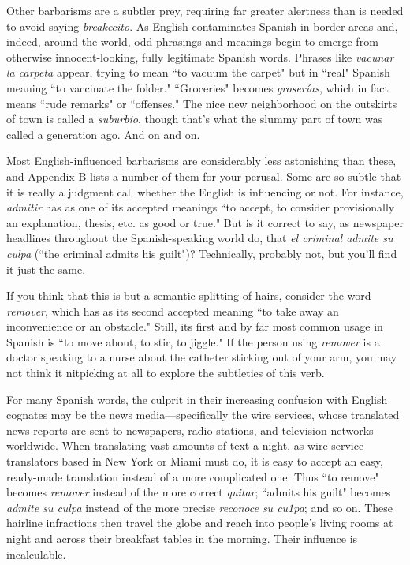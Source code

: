 Other barbarisms are a subtler prey, requiring far greater alertness than is needed to avoid saying \emph{breakecito}. As English contaminates Spanish in border areas and, indeed, around the world, odd phrasings and meanings begin to emerge from otherwise innocent-looking,
fully legitimate Spanish words. Phrases like \emph{vacunar la carpeta} appear,
trying to mean ``to vacuum the carpet" but in ``real" Spanish meaning
``to vaccinate the folder." ``Groceries" becomes \emph{groserías}, which in
fact means ``rude remarks" or ``offenses." The nice new neighborhood
on the outskirts of town is called a \emph{suburbio}, though that's what the
slummy part of town was called a generation ago. And on and on.

Most English-influenced barbarisms are considerably less astonishing than these, and Appendix B lists a number of them for your
perusal. Some are so subtle that it is really a judgment call whether
the English is influencing or not. For instance, \emph{admitir} has as one of
its accepted meanings ``to accept, to consider provisionally an explanation, thesis, etc. as good or true." But is it correct to say, as newspaper
headlines throughout the Spanish-speaking world do, that \emph{el criminal
	admite su culpa} (``the criminal admits his guilt")? Technically, probably not, but you'll find it just the same.

If you think that this is but a semantic splitting of hairs, consider the word \emph{remover}, which has as its second accepted meaning ``to
take away an inconvenience or an obstacle." Still, its first and by far
most common usage in Spanish is ``to move about, to stir, to jiggle."
If the person using \emph{remover} is a doctor speaking to a nurse about the
catheter sticking out of your arm, you may not think it nitpicking at
all to explore the subtleties of this verb.

For many Spanish words, the culprit in their increasing confusion with English cognates may be the news media---specifically the
wire services, whose translated news reports are sent to newspapers,
radio stations, and television networks worldwide. When translating
vast amounts of text a night, as wire-service translators based in New
York or Miami must do, it is easy to accept an easy, ready-made translation instead of a more complicated one. Thus ``to remove" becomes
\emph{remover} instead of the more correct \emph{quitar}; ``admits his guilt" becomes \emph{admite su culpa} instead of the more precise \emph{reconoce su cu1pa};
and so on. These hairline infractions then travel the globe and reach
into people's living rooms at night and across their breakfast tables in
the morning. Their influence is incalculable.

